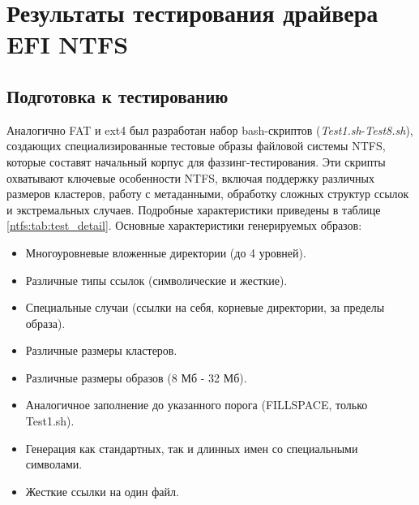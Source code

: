 \section{Результаты тестирования драйвера EFI NTFS}

\subsection{Подготовка к тестированию}
Аналогично FAT и ext4 был разработан набор bash-скриптов (\textit{Test1.sh}-\textit{Test8.sh}), создающих специализированные тестовые образы файловой системы NTFS, которые составят начальный корпус для фаззинг-тестирования. Эти скрипты охватывают ключевые особенности NTFS, включая поддержку различных размеров кластеров, работу с метаданными, обработку сложных структур ссылок и экстремальных случаев. Подробные характеристики приведены в таблице \ref{ntfs:tab:test_detail}. Основные характеристики генерируемых образов:
\begin{itemize}
	\item Многоуровневые вложенные директории (до 4 уровней).
	\item Различные типы ссылок (символические и жесткие).
	\item Специальные случаи (ссылки на себя, корневые директории, за пределы образа).
	\item Различные размеры кластеров.
	\item Различные размеры образов (8 Мб - 32 Мб).
	\item Аналогичное заполнение до указанного порога (FILLSPACE, только Test1.sh).
	\item Генерация как стандартных, так и длинных имен со специальными символами.
	\item Жесткие ссылки на один файл.
\end{itemize} 

